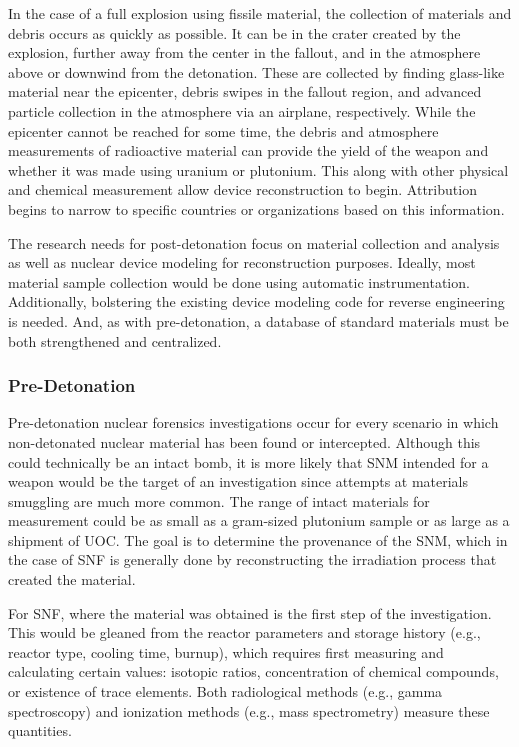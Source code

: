 In the case of a full explosion using fissile material, the collection of
materials and debris occurs as quickly as possible.  It can be in the crater
created by the explosion, further away from the center in the fallout, and in
the atmosphere above or downwind from the detonation. These are collected by
finding glass-like material near the epicenter, debris swipes in the fallout
region, and advanced particle collection in the atmosphere via an airplane,
respectively.  While the epicenter cannot be reached for some time, the debris
and atmosphere measurements of radioactive material can provide the yield of
the weapon and whether it was made using uranium or plutonium. This along with
other physical and chemical measurement allow device reconstruction to begin.
Attribution begins to narrow to specific countries or organizations based on
this information. \cite{aps_aaas_forensics}

The research needs for post-detonation focus on material collection and
analysis as well as nuclear device modeling for reconstruction purposes.
Ideally, most material sample collection would be done using automatic
instrumentation.  Additionally, bolstering the existing device modeling code
for reverse engineering is needed.  And, as with pre-detonation, a database of
standard materials must be both strengthened and centralized.
\cite{aps_aaas_forensics}

\subsubsection{Pre-Detonation}
\label{sec:predet}

Pre-detonation nuclear forensics investigations occur for every scenario in
which non-detonated nuclear material has been found or intercepted. Although
this could technically be an intact bomb, it is more likely that \gls{SNM}
intended for a weapon would be the target of an investigation since attempts at
materials smuggling are much more common.  The range of intact materials for
measurement could be as small as a gram-sized plutonium sample or as large as a
shipment of \gls{UOC}. The goal is to determine the provenance of the
\gls{SNM}, which in the case of \gls{SNF} is generally done by reconstructing
the irradiation process that created the material. 

For \gls{SNF}, where the material was obtained is the first step of the
investigation. This would be gleaned from the reactor parameters and storage
history (e.g., reactor type, cooling time, burnup), which requires first
measuring and calculating certain values: isotopic ratios, concentration of
chemical compounds, or existence of trace elements.  Both radiological methods
(e.g., gamma spectroscopy) and ionization methods (e.g., mass spectrometry)
measure these quantities.  

